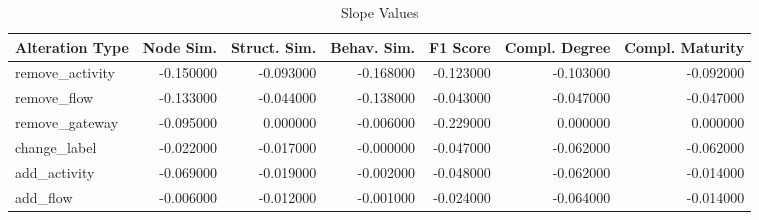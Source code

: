 \begin{table}
\caption{Slope Values}
\label{tab:slope}
\begin{tabular}{lrrrrrr}
\toprule
Alteration Type & Node Sim. & Struct. Sim. & Behav. Sim. & F1 Score & Compl. Degree & Compl. Maturity \\
\midrule
remove_activity & -0.150000 & -0.093000 & -0.168000 & -0.123000 & -0.103000 & -0.092000 \\
remove_flow & -0.133000 & -0.044000 & -0.138000 & -0.043000 & -0.047000 & -0.047000 \\
remove_gateway & -0.095000 & 0.000000 & -0.006000 & -0.229000 & 0.000000 & 0.000000 \\
change_label & -0.022000 & -0.017000 & -0.000000 & -0.047000 & -0.062000 & -0.062000 \\
add_activity & -0.069000 & -0.019000 & -0.002000 & -0.048000 & -0.062000 & -0.014000 \\
add_flow & -0.006000 & -0.012000 & -0.001000 & -0.024000 & -0.064000 & -0.014000 \\
\bottomrule
\end{tabular}
\end{table}
